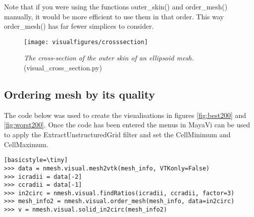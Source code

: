 Note that if you were using the functions {\ttfamily outer\_skin()} and {\ttfamily order\_mesh()} manually, it would be more efficient to use them in that order. This way {\ttfamily order\_mesh()} has far fewer simplices to consider.


\newpage
\begin{landscape}
\begin{figure}
\begin{center}
\texttt{[image: visualfigures/crosssection]}
\caption{{\em The cross-section of the outer skin of an ellipsoid mesh. }(visual\_cross\_section.py)\label{fig:crosssection}}
\end{center}
\end{figure}
\end{landscape}



\subsection{Ordering mesh by its quality}
The code below was used to create the visualisations in figures \ref{fig:best200} and \ref{fig:worst200}.
Once the code has been entered the menus in MayaVi can be used to apply the ExtractUnstructuredGrid filter and set the CellMinimum and CellMaximum. 

\begin{lstlisting}[basicstyle=\small\ttfamily][basicstyle=\tiny]
>>> data = nmesh.visual.mesh2vtk(mesh_info, VTKonly=False)
>>> icradii = data[-2]
>>> ccradii = data[-1]
>>> in2circ = nmesh.visual.findRatios(icradii, ccradii, factor=3)
>>> mesh_info2 = nmesh.visual.order_mesh(mesh_info, data=in2circ)
>>> v = nmesh.visual.solid_in2circ(mesh_info2)
\end{lstlisting}
%